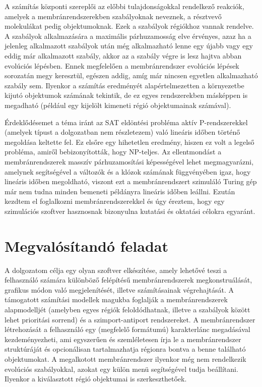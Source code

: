A számítás központi szereplői az előbbi tulajdonságokkal rendelkező reakciók, amelyek a membránrendszerekben szabályoknak neveznek, a résztvevő molekulákat pedig objektumoknak. Ezek a szabályok régiókhoz vannak rendelve. A szabályok alkalmazására a maximális párhuzamosság elve érvényes, azaz ha a jelenleg alkalmazott szabályok után még alkalmazható lenne egy újabb vagy egy eddig már alkalmazott szabály, akkor az a szabály végre is lesz hajtva abban evolúciós lépésben. Ennek megfelelően a membránrendszer evolúciós lépések sorozatán megy keresztül, egészen addig, amíg már nincsen egyetlen alkalmazható szabály sem. Ilyenkor a számítás eredményét alapértelmezetten a környezetbe kijutó objektumok számának tekintik, de ez egyes rendszerekben másképpen is megadható (például egy kijelölt kimeneti régió objektumainak számával).

Érdeklődésemet a téma iránt az SAT eldöntési probléma aktív P-rendszerekkel (amelyek típust a dolgozatban nem részletezem) való lineáris időben történő megoldása keltette fel. Ez elsőre egy hihetetlen eredmény, hiszen ez volt a legelső probléma, amiről bebizonyították, hogy NP-teljes. Az ellentmondást a membránrendszerek masszív párhuzamosítási képességével lehet megmagyarázni, amelynek segítségével a változók és a klózok számának függvényében igaz, hogy lineáris időben megoldható, viszont ezt a membránrendszert szimuláló Turing gép már nem tudna minden bemeneti példányra lineáris időben leállni. Ezután kezdtem el foglalkozni membránrendszerekkel és úgy éreztem, hogy egy szimulációs szoftver hasznosnak bizonyulna kutatási és oktatási célokra egyaránt.

\section{Megvalósítandó feladat}

A dolgozatom célja egy olyan szoftver elkészítése, amely lehetővé teszi a felhasználó számára különböző felépítésű membránrendszerek megkonstruálását, grafikus módon való megjelenítését, illetve számításainak végrehajtását. A támogatott számítási modellek magukba foglalják a membránrendszerek alapmodelljét (amelyben egyes régiók feloldódhatnak, illetve a szabályok között lehet prioritási sorrend) és a szimport-antiport rendszereket.
A membránrendszer létrehozását a felhasználó egy (megfelelő formátumú) karakterlánc megadásával kezdeményezheti, ami egyszerűen és szemléletesen írja le a membránrendszer struktúráját és opcionálisan tartalmazhatja régionra bontva a benne található objektumokat. A megalkotott membránrendszer ilyenkor még nem rendelkezik evolúciós szabályokkal, azokat egy külön menü segítségével tudja beállítani. Ilyenkor a kiválasztott régió objektumai is szerkeszthetőek.

